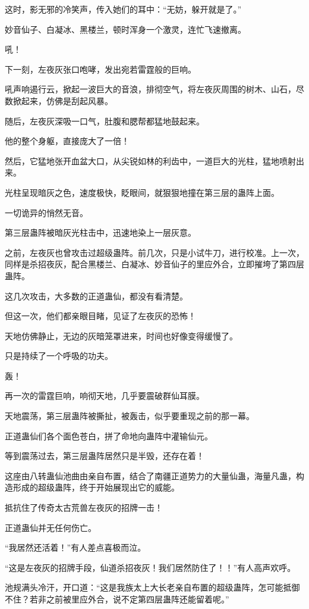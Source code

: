 \begin{this_body}
这时，影无邪的冷笑声，传入她们的耳中：“无妨，躲开就是了。”

妙音仙子、白凝冰、黑楼兰，顿时浑身一个激灵，连忙飞速撤离。

吼！

下一刻，左夜灰张口咆哮，发出宛若雷霆般的巨响。

吼声响遏行云，掀起一波巨大的音浪，排彻空气，将左夜灰周围的树木、山石，尽数掀起来，仿佛是刮起风暴。

随后，左夜灰深吸一口气，肚腹和腮帮都猛地鼓起来。

他的整个身躯，直接庞大了一倍！

然后，它猛地张开血盆大口，从尖锐如林的利齿中，一道巨大的光柱，猛地喷射出来。

光柱呈现暗灰之色，速度极快，眨眼间，就狠狠地撞在第三层的蛊阵上面。

一切诡异的悄然无音。

第三层蛊阵被暗灰光柱击中，迅速地染上一层灰意。

之前，左夜灰也曾攻击过超级蛊阵。前几次，只是小试牛刀，进行校准。上一次，同样是杀招夜灰，配合黑楼兰、白凝冰、妙音仙子的里应外合，立即摧垮了第四层蛊阵。

这几次攻击，大多数的正道蛊仙，都没有看清楚。

但这一次，他们都亲眼目睹，见证了左夜灰的恐怖！

天地仿佛静止，无边的灰暗笼罩进来，时间也好像变得缓慢了。

只是持续了一个呼吸的功夫。

轰！

再一次的雷霆巨响，响彻天地，几乎要震破群仙耳膜。

天地震荡，第三层蛊阵被撕扯，被轰击，似乎要重现之前的那一幕。

正道蛊仙们各个面色苍白，拼了命地向蛊阵中灌输仙元。

等到震荡过去，第三层蛊阵居然只是半毁，还存在着！

这座由八转蛊仙池曲由亲自布置，结合了南疆正道势力的大量仙蛊，海量凡蛊，构造形成的超级蛊阵，终于开始展现出它的威能。

抵抗住了传奇太古荒兽左夜灰的招牌一击！

正道蛊仙并无任何伤亡。

“我居然还活着！”有人差点喜极而泣。

“这是左夜灰的招牌手段，仙道杀招夜灰！我们居然防住了！！”有人高声欢呼。

池规满头冷汗，开口道：“这是我族太上大长老亲自布置的超级蛊阵，怎可能抵御不住？若非之前被里应外合，说不定第四层蛊阵还能留着呢。”


\end{this_body}
